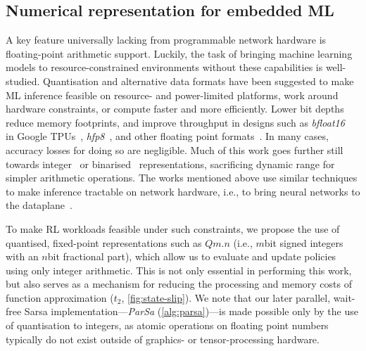 \documentclass[sigconf,natbib=false]{acmart}
\newcounter{insightc}
\newenvironment{insight}
	{
		\begin{tipblock}\refstepcounter{insightc}\textbf{Insight \theinsightc:}\em
	}
	{
		\end{tipblock}
	}
\begin{document}

\subsection{Numerical representation for embedded ML}
A key feature universally lacking from programmable network hardware is floating-point arithmetic support.
Luckily, the task of bringing machine learning models to resource-constrained environments without these capabilities is well-studied.
Quantisation and alternative data formats have been suggested to make ML inference feasible on resource- and power-limited platforms, work around hardware constraints, or compute faster and more efficiently.
Lower bit depths reduce memory footprints, and improve throughput in designs such as \emph{bfloat16}~\parencite{bfloat16-blog} in Google TPUs~\parencite{DBLP:journals/sigops/XieDMKVZT18}, \emph{hfp8}~\parencite{DBLP:conf/nips/SunCCWVSCZG19}, and other floating point formats~\parencite{DBLP:journals/corr/abs-2007-01530}.
In many cases, accuracy losses for doing so are negligible.
Much of this work goes further still towards integer~\parencite{tensorrt-8bit} or binarised~\parencite{DBLP:journals/corr/MiyashitaLM16,DBLP:conf/eccv/RastegariORF16,DBLP:journals/corr/KimS16,DBLP:conf/nips/HubaraCSEB16} representations, sacrificing dynamic range for simpler arithmetic operations.
The works mentioned above use similar techniques to make inference tractable on network hardware, i.e., to bring neural networks to the dataplane~\parencite{DBLP:journals/corr/abs-2009-02353,DBLP:conf/sigcomm/SanvitoSB18,DBLP:journals/corr/abs-1801-05731}.

To make RL workloads feasible under such constraints, we propose the use of quantised, fixed-point representations such as $Qm.n$ (i.e., $m$\si{bit} signed integers with an $n$\si{bit} fractional part), which allow us to evaluate and update policies using only integer arithmetic.
This is not only essential in performing this work, but also serves as a mechanism for reducing the processing and memory costs of function approximation ($t_2$, \cref{fig:state-slip}).
We note that our later parallel, wait-free Sarsa implementation---\emph{ParSa} (\cref{alg:parsa})---is made possible only by the use of quantisation to integers, as atomic operations on floating point numbers typically do not exist outside of graphics- or tensor-processing hardware.
\end{document}
